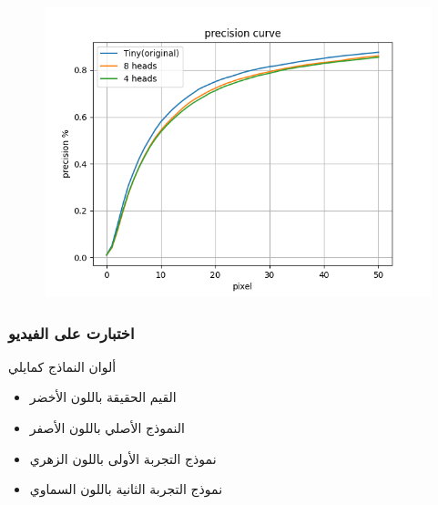 \begin{figure}[H]
	\centerline{\includegraphics[width=\textwidth]{charts/precision curve}}
	\caption{}
	\label{fig:precision}
\end{figure}

\subsubsection{اختبارت على  الفيديو}
ألوان النماذج كمايلي
\begin{itemize}
	\item 	القيم الحقيقة باللون الأخضر
	\item
	النموذج الأصلي 
	باللون الأصفر
	\item
	نموذج التجربة الأولى
	باللون الزهري
	\item
	نموذج التجربة الثانية
	باللون السماوي
\end{itemize}


